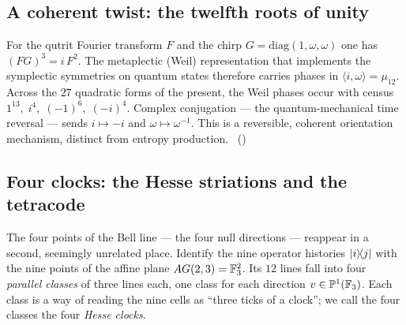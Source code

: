 \subsection{A coherent twist: the twelfth roots of unity}

For the qutrit Fourier transform $F$ and the chirp $G=\mathrm{diag}(1,\omega,\omega)$ one
has $(FG)^3=i\,F^2$. The metaplectic (Weil) representation that implements the symplectic
symmetries on quantum states therefore carries phases in $\langle i,\omega\rangle=\mu_{12}$.
Across the $27$ quadratic forms of the present, the Weil phases occur with census
$1^{13},\;i^{4},\;(-1)^{6},\;(-i)^{4}$. Complex conjugation --- the quantum-mechanical time
reversal --- sends $i\mapsto -i$ and $\omega\mapsto\omega^{-1}$. This is a reversible,
coherent orientation mechanism, distinct from entropy production. \tierC\
()

\subsection{Four clocks: the Hesse striations and the tetracode}

The four points of the Bell line --- the four null directions --- reappear in a second,
seemingly unrelated place. Identify the nine operator histories $\lvert i\rangle\!\langle j\rvert$ with the
nine points of the affine plane $AG(2,3)=\mathbb{F}_3^2$. Its $12$ lines fall into four
\emph{parallel classes} of three lines each, one class for each direction
$v\in\mathbb{P}^1(\mathbb{F}_3)$. Each class is a way of reading the nine cells as ``three ticks of
a clock''; we call the four classes the four \emph{Hesse clocks}.

